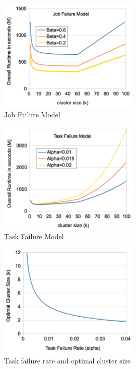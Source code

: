 \begin{figure}[h!]
	\centering
    \includegraphics[width=0.6\textwidth]{figures/tolerance/ftc_jfm.pdf}
    \caption{Job Failure Model }
    \label{fig:ftc_jfm}
\end{figure}

 \begin{figure}[h!]
	\centering
    \includegraphics[width=0.6\textwidth]{figures/tolerance/ftc_tfm.pdf}
    \caption{Task Failure Model }
    \label{fig:ftc_tfm}
\end{figure}

\begin{figure}[h!]
	\centering
    \includegraphics[width=0.6\textwidth]{figures/tolerance/ftc_relation.pdf}
    \caption{Task failure rate and optimal cluster size}
    \label{fig:ftc_relation}
\end{figure}
 
